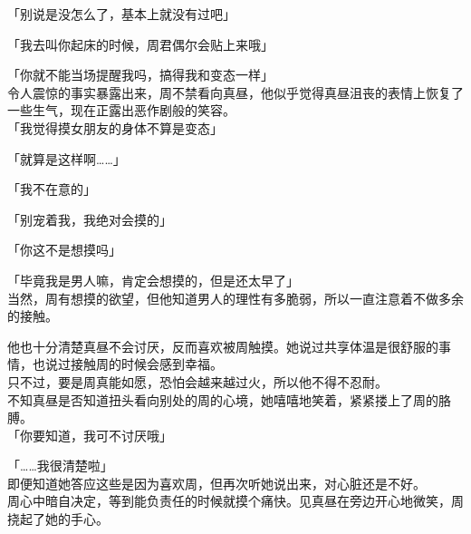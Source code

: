 「别说是没怎么了，基本上就没有过吧」

「我去叫你起床的时候，周君偶尔会贴上来哦」

「你就不能当场提醒我吗，搞得我和变态一样」\\

令人震惊的事实暴露出来，周不禁看向真昼，他似乎觉得真昼沮丧的表情上恢复了一些生气，现在正露出恶作剧般的笑容。\\

「我觉得摸女朋友的身体不算是变态」

「就算是这样啊……」

「我不在意的」

「别宠着我，我绝对会摸的」

「你这不是想摸吗」

「毕竟我是男人嘛，肯定会想摸的，但是还太早了」\\

当然，周有想摸的欲望，但他知道男人的理性有多脆弱，所以一直注意着不做多余的接触。

他也十分清楚真昼不会讨厌，反而喜欢被周触摸。她说过共享体温是很舒服的事情，也说过接触周的时候会感到幸福。\\

只不过，要是周真能如愿，恐怕会越来越过火，所以他不得不忍耐。\\

不知真昼是否知道扭头看向别处的周的心境，她嘻嘻地笑着，紧紧搂上了周的胳膊。\\

「你要知道，我可不讨厌哦」

「……我很清楚啦」\\

即便知道她答应这些是因为喜欢周，但再次听她说出来，对心脏还是不好。\\

周心中暗自决定，等到能负责任的时候就摸个痛快。见真昼在旁边开心地微笑，周挠起了她的手心。
